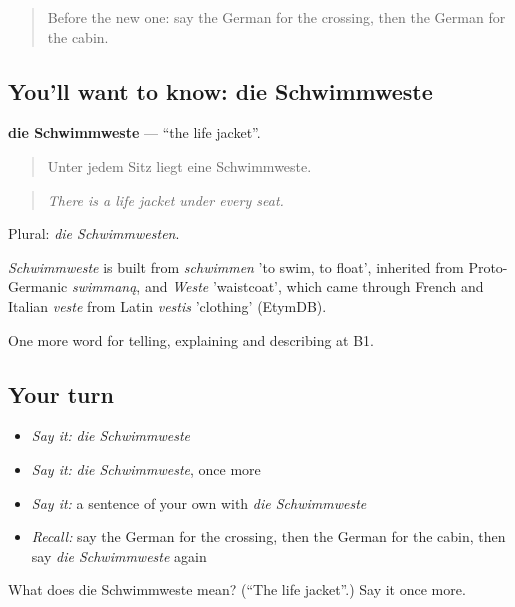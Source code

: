 \begin{quote}
Before the new one: say the German for the crossing, then the German for the cabin.
\end{quote}

\subsection*{You'll want to know: die Schwimmweste}
\textbf{die Schwimmweste} — \textquotedblleft{}the life jacket\textquotedblright{}.

\begin{quote}
Unter jedem Sitz liegt eine Schwimmweste.
\end{quote}

\begin{quote}
\emph{There is a life jacket under every seat.}
\end{quote}

Plural: \emph{die Schwimmwesten}.

\begin{cousinweb}
\emph{Schwimmweste} is built from \emph{schwimmen} 'to swim, to float', inherited from Proto-Germanic \emph{swimmaną}, and \emph{Weste} 'waistcoat', which came through French and Italian \emph{veste} from Latin \emph{vestis} 'clothing' (EtymDB).
\end{cousinweb}

\begin{grammarlens}[title={What you've built}]
One more word for telling, explaining and describing at B1.
\end{grammarlens}

\subsection*{Your turn}
\begin{itemize}
\raggedright
  \item \emph{Say it:} \emph{die Schwimmweste}
  \item \emph{Say it:} \emph{die Schwimmweste}, once more
  \item \emph{Say it:} a sentence of your own with \emph{die Schwimmweste}
  \item \emph{Recall:} say the German for the crossing, then the German for the cabin, then say \emph{die Schwimmweste} again
\end{itemize}

\begin{tcolorbox}[breakable,colback=teal!4,colframe=teal!35!black,title={Before you move on}]
What does die Schwimmweste mean? (\textquotedblleft{}The life jacket\textquotedblright{}.) Say it once more.
\end{tcolorbox}
